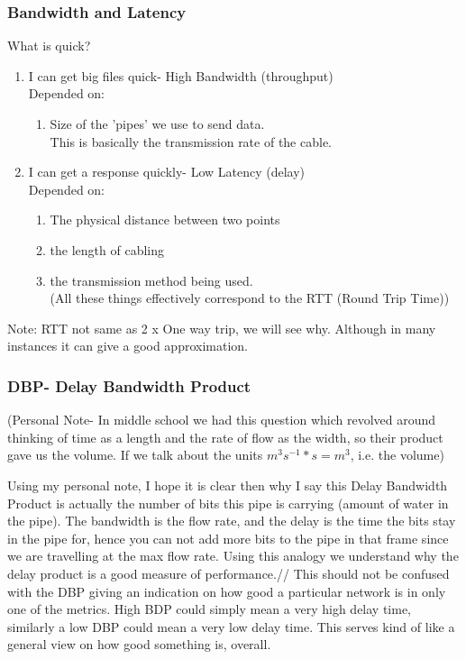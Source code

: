 \documentclass[11pt, a4paper]{article}
\begin{document}
\subsubsection{Bandwidth and Latency}
What is quick?
\begin{enumerate}
    \item I can get big files quick- High Bandwidth (throughput)\\
    Depended on:
    \begin{enumerate}
        \item Size of the 'pipes' we use to send data.\\
        This is basically the transmission rate of the cable.
    \end{enumerate}
    \item I can get a response quickly- Low Latency (delay)\\
    Depended on:
    \begin{enumerate}
        \item The physical distance between two points
        \item the length of cabling
        \item the transmission method being used.\\
        (All these things effectively correspond to the RTT (Round Trip Time))
    \end{enumerate}
\end{enumerate}
Note: RTT not same as 2 x One way trip, we will see why. Although in many instances it can give a good approximation.

\subsubsection{DBP- Delay Bandwidth Product}
(Personal Note- In middle school we had this question which revolved around thinking of time as a length and the rate of flow as the width, so their product gave us the volume. If we talk about the units $m^{3}s^{-1} * s = m^{3}$, i.e. the volume)

Using my personal note, I hope it is clear then why I say this Delay Bandwidth Product is actually the number of bits this pipe is carrying (amount of water in the pipe). The bandwidth is the flow rate, and the delay is the time the bits stay in the pipe for, hence you can not add more bits to the pipe in that frame since we are travelling at the max flow rate. Using this analogy we understand why the delay product is a good measure of performance.//
This should not be confused with the DBP giving an indication on how good a particular network is in only one of the metrics. High BDP could simply mean a very high delay time, similarly a low DBP could mean a very low delay time. This serves kind of like a general view on how good something is, overall.
\end{document}
